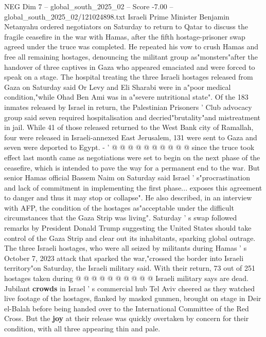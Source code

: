 \begin{textsample}{NEG Dim 7 – global\_south\_2025\_02 – Score -7.00 – global\_south\_2025\_02/121024898.txt}  \label{ex:f7_neg_268}
Israeli Prime Minister Benjamin Netanyahu ordered negotiators on Saturday to return to Qatar to discuss the fragile ceasefire in the war with Hamas, after the fifth hostage-prisoner swap agreed under the truce was completed.
He repeated his vow to crush Hamas and free all remaining hostages, denouncing the militant group as"monsters"after the handover of three captives in Gaza who appeared emaciated and were forced to speak on a stage.
The hospital treating the three Israeli hostages released from Gaza on Saturday said Or Levy and Eli Sharabi were in a"poor medical condition,"while Ohad Ben Ami was in a"severe nutritional state".
Of the 183 inmates released by Israel in return, the Palestinian Prisoners ' Club advocacy group said seven required hospitalisation and decried"brutality"and mistreatment in jail.
While 41 of those released returned to the West Bank city of Ramallah, four were released in Israeli-annexed East Jerusalem, 131 were sent to Gaza and seven were deported to Egypt. - ' @ @ @ @ @ @ @ @ @ @ since the truce took effect last month came as negotiations were set to begin on the next phase of the ceasefire, which is intended to pave the way for a permanent end to the war.
But senior Hamas official Bassem Naim on Saturday said Israel ' s"procrastination and lack of commitment in implementing the first phase... exposes this agreement to danger and thus it may stop or collapse".
He also described, in an interview with AFP, the condition of the hostages as"acceptable under the difficult circumstances that the Gaza Strip was living".
Saturday ' s swap followed remarks by President Donald Trump suggesting the United States should take control of the Gaza Strip and clear out its inhabitants, sparking global outrage.
The three Israeli hostages, who were all seized by militants during Hamas ' s October 7, 2023 attack that sparked the war,"crossed the border into Israeli territory"on Saturday, the Israeli military said.
With their return, 73 out of 251 hostages taken during @ @ @ @ @ @ @ @ @ @ Israeli military says are dead.
Jubilant \textbf{crowds} in Israel ' s commercial hub Tel Aviv cheered as they watched live footage of the hostages, flanked by masked gunmen, brought on stage in Deir el-Balah before being handed over to the International Committee of the Red Cross.
But the \textbf{joy} at their release was quickly overtaken by concern for their condition, with all three appearing thin and pale.

\end{textsample}
